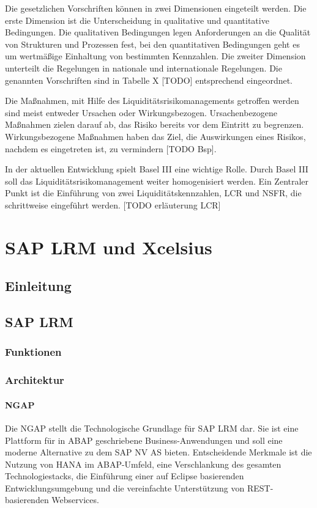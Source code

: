 Die gesetzlichen Vorschriften können in zwei Dimensionen eingeteilt werden. Die erste Dimension ist die Unterscheidung in qualitative und quantitative Bedingungen. Die qualitativen Bedingungen legen Anforderungen an die Qualität von Strukturen und Prozessen fest, bei den quantitativen Bedingungen geht es um wertmäßige Einhaltung von bestimmten Kennzahlen. Die zweiter Dimension unterteilt die Regelungen in nationale und internationale Regelungen. Die genannten Vorschriften sind in Tabelle X [TODO] entsprechend eingeordnet. 

Die Maßnahmen, mit Hilfe des Liquiditätsrisikomanagements getroffen werden sind meist entweder Ursachen oder Wirkungsbezogen. Ursachenbezogene Maßnahmen zielen darauf ab, das Risiko bereits vor dem Eintritt zu begrenzen. Wirkungsbezogene Maßnahmen haben das Ziel, die Auswirkungen eines Risikos, nachdem es eingetreten ist, zu vermindern [TODO Bsp].

In der aktuellen Entwicklung spielt Basel III eine wichtige Rolle. Durch Basel III soll das Liquiditätsrisikomanagement weiter homogenisiert werden. Ein Zentraler Punkt ist die Einführung von zwei Liquiditätskennzahlen, LCR und NSFR, die schrittweise eingeführt werden. [TODO erläuterung LCR]


\chapter{SAP LRM und Xcelsius}
\section{Einleitung}
\section{SAP LRM}
\subsection{Funktionen}
\subsection{Architektur}
\newpage
\subsubsection{NGAP}
Die \gls{NGAP} stellt die Technologische Grundlage für SAP LRM dar. Sie ist eine Plattform für in ABAP geschriebene Business-Anwendungen und soll eine moderne Alternative zu dem SAP NV AS bieten. Entscheidende Merkmale ist die Nutzung von \gls{HANA} im ABAP-Umfeld, eine Verschlankung des gesamten Technologiestacks, die Einführung einer auf Eclipse basierenden Entwicklungsumgebung und die vereinfachte Unterstützung von REST-basierenden Webservices.


